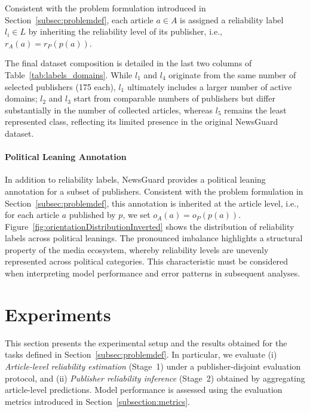 \documentclass[journal]{IEEEtran}
\begin{document}
Consistent with the problem formulation introduced in Section~\ref{subsec:problemdef}, each article \(a \in A\) is assigned a reliability label \(l_i \in L\) by inheriting the reliability level of its publisher, i.e., \(r_A(a) = r_P(p(a))\).


The final dataset composition is detailed in the last two columns of Table~\ref{tab:labels_domains}. While $l_1$ and $l_4$ originate from the same number of selected publishers (175 each), $l_1$ ultimately includes a larger number of active domains; $l_2$ and $l_3$ start from comparable numbers of publishers but differ substantially in the number of collected articles, whereas $l_5$ remains the least represented class, reflecting its limited presence in the original NewsGuard dataset.


\paragraph{Political Leaning Annotation}
\label{sec:politicalLeaningDataset}

In addition to reliability labels, NewsGuard provides a political leaning annotation for a subset of publishers.
Consistent with the problem formulation in
Section~\ref{subsec:problemdef}, this annotation is inherited at the article
level, i.e., for each article \(a\) published by \(p\), we set
\(o_A(a) = o_P(p(a))\).
Figure~\ref{fig:orientationDistributionInverted} shows the distribution of reliability labels across political leanings.
The pronounced imbalance highlights a structural property of the media ecosystem, whereby reliability levels are unevenly represented across political categories.
This characteristic must be considered when interpreting model performance and error patterns in subsequent analyses.

\section{Experiments}

This section presents the experimental setup and the results obtained
for the tasks defined in Section~\ref{subsec:problemdef}. In particular, we evaluate (i) \emph{Article-level reliability estimation} (Stage~1) under a
publisher-disjoint evaluation protocol, and (ii) \emph{Publisher reliability inference}
(Stage~2) obtained by aggregating article-level predictions. Model performance
is assessed using the evaluation metrics introduced in
Section~\ref{subsection:metrics}.
\end{document}
